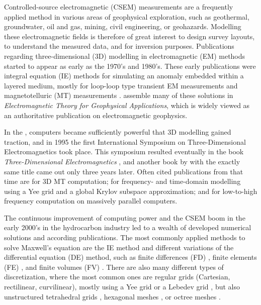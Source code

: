 \documentclass[extra, camera,%
]{gji}
\begin{document}
Controlled-source electromagnetic (CSEM) measurements are a frequently applied method in various areas of geophysical exploration, such as geothermal, groundwater, oil and gas, mining, civil engineering, or geohazards. Modelling these electromagnetic fields is therefore of great interest to design survey layouts, to understand the measured data, and for inversion purposes. Publications regarding three-dimensional (3D) modelling in electromagnetic (EM) methods started to appear as early as the 1970's and 1980's. These early publications were integral equation (IE) methods for simulating an anomaly embedded within a layered medium, mostly for loop-loop type transient EM measurements  \citep{GJI.74.Raiche, GEO.75.Hohmann, GJI.82.Das, GEO.86.Newman} and magnetotelluric (MT) measurements \citep{GEO.84.Wannamaker}. \cite{B.SEG.88.Ward} assemble many of these solutions in \emph{Electromagnetic Theory for Geophysical Applications}, which is widely viewed as an authoritative publication on electromagnetic geophysics.

In the , computers became sufficiently powerful that 3D modelling gained traction, and in 1995 the first International Symposium on Three-Dimensional Electromagnetics took place. This symposium resulted eventually in the book \emph{Three-Dimensional Electromagnetics} \citep{B.SEG.99.Oristaglio}, and another book by \cite{B.02.Wannamaker} with the exactly same title came out only three years later. Often cited publications from that time are \cite{RSC.94.Mackie} for 3D MT computation; \cite{RS.94.Druskin} for frequency- and time-domain modelling using a Yee grid and a global Krylov subspace approximation; and \cite{RS.96.Alumbaugh, GJI.97.Newman} for low-to-high frequency computation on massively parallel computers.

The continuous improvement of computing power and the CSEM boom in the early 2000's in the hydrocarbon industry led to a wealth of developed numerical solutions and according publications. The most commonly applied methods to solve Maxwell's equation are the IE method \citep{GJI.74.Raiche, RS.02.Hursan, GEO.06.Zhdanov, GP.10.Tehrani, CAG.16.Kruglyakov, MGS.17.Kruglyakov} and different variations of the differential equation (DE) method, such as finite differences (FD) \citep{GEO.93.Wang, RS.94.Druskin, RSC.94.Mackie, GEO.09.Streich, CAG.13.Sommer}, finite elements (FE) \citep{GEO.04.Commer, GJI.11.Schwarzbach,GEO.12.daSilva, GJI.13.Grayver, GJI.13.Puzyrev, SEG.16.Zhang}, and finite volumes (FV) \citep{EM.90.Madsen, SIAM.01.Haber, PIER.01.Clemens, GEO.14.Jahandari}. There are also many different types of discretization, where the most common ones are regular grids (Cartesian, rectilinear, curvilinear), mostly using a Yee grid \citep{IEEE.66.Yee} or a Lebedev grid \citep{CMMP.64.Lebedev}, but also unstructured tetrahedral grids \citep{SEG.16.Zhang, CAG.17.Cai}, hexagonal meshes \citep{CAG.14.Cai}, or octree meshes \citep{ECP.07.Haber}.
\end{document}
